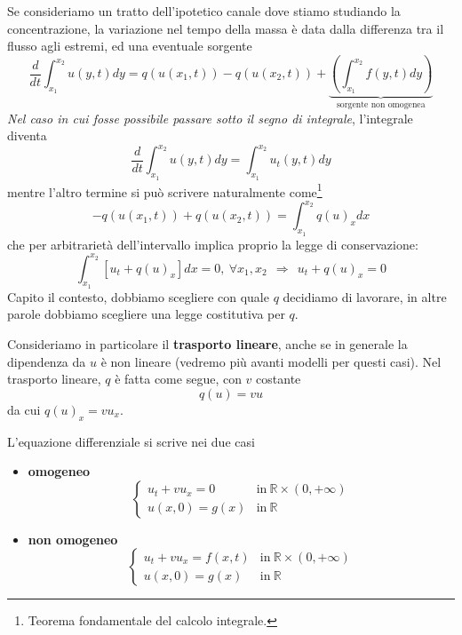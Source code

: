 \documentclass[10pt,a4paper,twoside,openright]{book}
\begin{document}
Se consideriamo un tratto dell'ipotetico canale dove stiamo studiando la concentrazione, la variazione nel tempo della massa è data dalla differenza tra il flusso agli estremi, ed una eventuale sorgente
\begin{equation*}
	\frac{d}{dt}\int ^{x_{2}}_{x_{1}} u( y,t) dy=q( u( x_{1} ,t)) -q( u( x_{2} ,t)) +\underbrace{\left(\int ^{x_{2}}_{x_{1}} f( y,t) dy\right)}_{\text{sorgente non omogenea}}
\end{equation*}
\emph{Nel caso in cui fosse possibile passare sotto il segno di integrale}, l'integrale diventa %
\begin{equation}
	\frac{d}{dt}\int ^{x_{2}}_{x_{1}} u( y,t) dy=\int ^{x_{2}}_{x_{1}} u_{t}( y,t) dy
	\label{eq:lc-passaggio-derivata-integrale}
\end{equation}
mentre l'altro termine si può scrivere naturalmente come\footnote{Teorema fondamentale del calcolo integrale.}
\begin{equation*}
	-q( u( x_{1} ,t)) +q( u( x_{2} ,t)) =\int ^{x_{2}}_{x_{1}} q( u)_{x} dx
\end{equation*}
che per arbitrarietà dell'intervallo implica proprio la legge di conservazione:
\begin{equation*}
	\int ^{x_{2}}_{x_{1}}[ u_{t} +q( u)_{x}] dx=0,\ \forall x_{1} ,x_{2} \ \ \Rightarrow \ \ u_{t} +q( u)_{x} =0
\end{equation*}
Capito il contesto, dobbiamo scegliere con quale $q$ decidiamo di lavorare, in altre parole dobbiamo scegliere una legge costitutiva per $q$.

Consideriamo in particolare il \textbf{trasporto lineare}, anche se in generale la dipendenza da $u$ è non lineare (vedremo più avanti modelli per questi casi). Nel trasporto lineare, $q$ è fatta come segue, con $v$ costante
\begin{equation}
	q( u) =vu
\end{equation}
da cui $q( u)_{x} =vu_{x}$.

L'equazione differenziale si scrive nei due casi
\begin{itemize}
	\item \textbf{omogeneo}
	      \begin{equation*}
	      	\begin{cases}
	      		u_{t} +vu_{x} =\boxed{0} & \text{in} \ \mathbb{R} \times ( 0,+\infty ) \\
	      		u( x,0) =g( x)   & \text{in} \ \mathbb{R}                      
	      	\end{cases}
	      \end{equation*}
	\item \textbf{non omogeneo}
	      \begin{equation*}
	      	\begin{cases}
	      		u_{t} +vu_{x} =\boxed{f(x,t)} & \text{in} \ \mathbb{R} \times ( 0,+\infty ) \\
	      		u( x,0) =g( x)         & \text{in} \ \mathbb{R}                      
	      	\end{cases}
	      \end{equation*}
\end{itemize}
\end{document}
